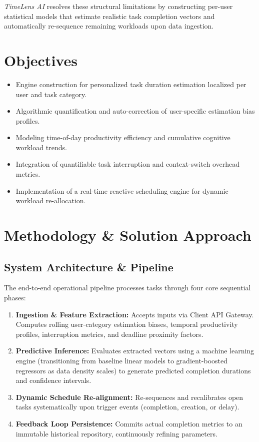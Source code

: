 \documentclass[11pt,a4paper]{article}
\begin{document}
\textit{TimeLens AI} resolves these structural limitations by constructing per-user statistical models that estimate realistic task completion vectors and automatically re-sequence remaining workloads upon data ingestion.

\section{Objectives}
\begin{itemize}
    \item Engine construction for personalized task duration estimation localized per user and task category.
    \item Algorithmic quantification and auto-correction of user-specific estimation bias profiles.
    \item Modeling time-of-day productivity efficiency and cumulative cognitive workload trends.
    \item Integration of quantifiable task interruption and context-switch overhead metrics.
    \item Implementation of a real-time reactive scheduling engine for dynamic workload re-allocation.
\end{itemize}

\section{Methodology \& Solution Approach}

\subsection{System Architecture \& Pipeline}
The end-to-end operational pipeline processes tasks through four core sequential phases:
\begin{enumerate}
    \item \textbf{Ingestion \& Feature Extraction:} Accepts inputs via Client API Gateway. Computes rolling user-category estimation biases, temporal productivity profiles, interruption metrics, and deadline proximity factors.
    \item \textbf{Predictive Inference:} Evaluates extracted vectors using a machine learning engine (transitioning from baseline linear models to gradient-boosted regressors as data density scales) to generate predicted completion durations and confidence intervals.
    \item \textbf{Dynamic Schedule Re-alignment:} Re-sequences and recalibrates open tasks systematically upon trigger events (completion, creation, or delay).
    \item \textbf{Feedback Loop Persistence:} Commits actual completion metrics to an immutable historical repository, continuously refining parameters.
\end{enumerate}
\end{document}
